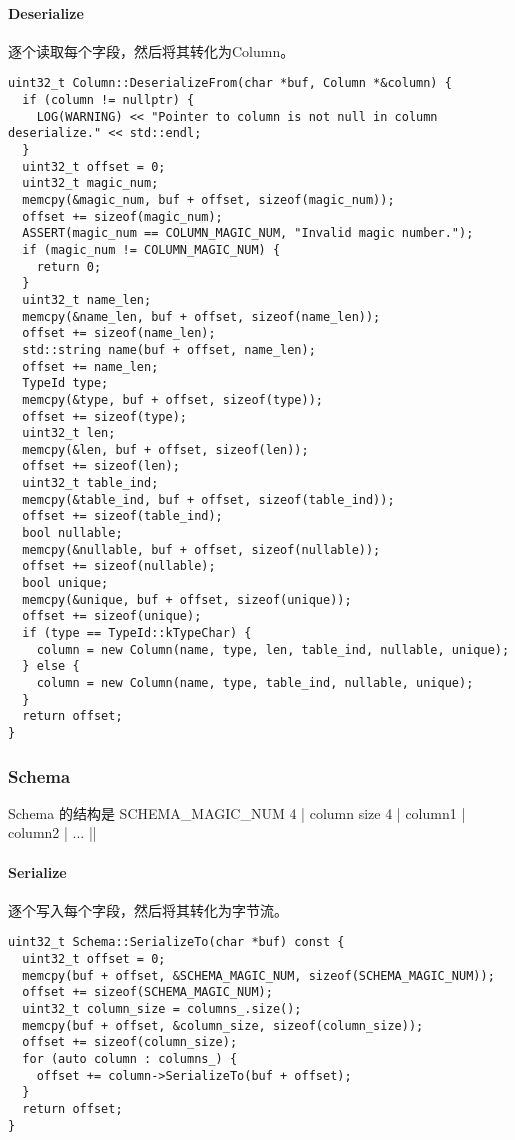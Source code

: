 \documentclass[12pt,hyperref,a4paper,UTF8]{ctexart}
\begin{document}
\paragraph{Deserialize}
逐个读取每个字段，然后将其转化为Column。
\begin{verbatim}
uint32_t Column::DeserializeFrom(char *buf, Column *&column) {
  if (column != nullptr) {
    LOG(WARNING) << "Pointer to column is not null in column deserialize." << std::endl;
  }
  uint32_t offset = 0;
  uint32_t magic_num;
  memcpy(&magic_num, buf + offset, sizeof(magic_num));
  offset += sizeof(magic_num);
  ASSERT(magic_num == COLUMN_MAGIC_NUM, "Invalid magic number.");
  if (magic_num != COLUMN_MAGIC_NUM) {
    return 0;
  } 
  uint32_t name_len;
  memcpy(&name_len, buf + offset, sizeof(name_len));
  offset += sizeof(name_len);
  std::string name(buf + offset, name_len);
  offset += name_len;
  TypeId type;
  memcpy(&type, buf + offset, sizeof(type));
  offset += sizeof(type);
  uint32_t len;
  memcpy(&len, buf + offset, sizeof(len));
  offset += sizeof(len);
  uint32_t table_ind;
  memcpy(&table_ind, buf + offset, sizeof(table_ind));
  offset += sizeof(table_ind);
  bool nullable;
  memcpy(&nullable, buf + offset, sizeof(nullable));
  offset += sizeof(nullable);
  bool unique;
  memcpy(&unique, buf + offset, sizeof(unique));
  offset += sizeof(unique);
  if (type == TypeId::kTypeChar) {
    column = new Column(name, type, len, table_ind, nullable, unique);
  } else {
    column = new Column(name, type, table_ind, nullable, unique);
  }
  return offset;
}
\end{verbatim}

\subsubsection{Schema}

Schema 的结构是\verb|| SCHEMA\_MAGIC\_NUM 4 | column size 4 | column1 | column2 | ... ||

\paragraph{Serialize}
逐个写入每个字段，然后将其转化为字节流。

\begin{verbatim}
uint32_t Schema::SerializeTo(char *buf) const {
  uint32_t offset = 0;
  memcpy(buf + offset, &SCHEMA_MAGIC_NUM, sizeof(SCHEMA_MAGIC_NUM));
  offset += sizeof(SCHEMA_MAGIC_NUM);
  uint32_t column_size = columns_.size();
  memcpy(buf + offset, &column_size, sizeof(column_size));
  offset += sizeof(column_size);
  for (auto column : columns_) {
    offset += column->SerializeTo(buf + offset);
  }
  return offset;
}
\end{verbatim}
\end{document}
